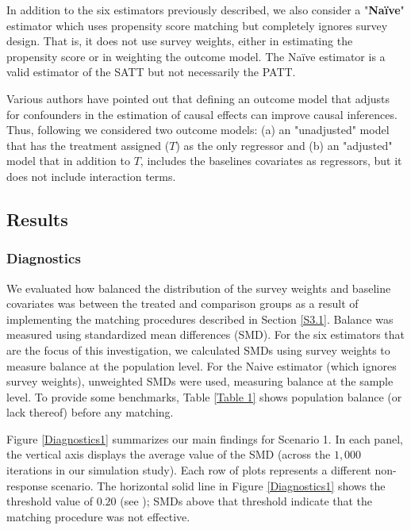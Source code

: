 \documentclass[oupdraft]{bio}
\begin{document}
In addition to the six estimators previously described, we also consider a "\textbf{Naïve}" estimator which uses propensity score matching but completely ignores survey design. That is, it does not use survey weights, either in estimating the propensity score or in weighting the outcome model. The Naïve estimator is a valid estimator of the SATT but not necessarily the PATT. 

Various authors \citep{cochran1973controlling,rubin1973use,carpenter1977matching,rubin1979using,rosenbaum1984reducing,rubin2000combining,glazerman2003nonexperimental,imai2004causal,abadie2006large} have pointed out that defining an outcome model that adjusts for confounders in the estimation of causal effects can improve causal inferences. Thus, following \cite{ridgeway2015propensity} we considered two outcome models: (a) an "unadjusted" model that has the treatment assigned ($T$) as the only regressor and (b) an "adjusted" model that in addition to $T$, includes the baselines covariates as regressors, but it does not include interaction terms.
\subsection{Results}
\label{S3.2}
\subsubsection*{Diagnostics}
We evaluated how balanced the distribution of the survey weights and baseline covariates was between the treated and comparison groups as a result of implementing the matching procedures described in Section \ref{S3.1}. Balance was measured using standardized mean differences (SMD). For the six estimators that are the focus of this investigation, we calculated SMDs using survey weights to measure balance at the population level.
For the Naive estimator (which ignores survey weights), unweighted SMDs were used, measuring balance at the sample level.
To provide some benchmarks, Table \ref{Table 1} shows population balance (or lack thereof) before any matching.

Figure \ref{Diagnostics1} summarizes our main findings for Scenario 1. In each panel, the vertical axis displays the average value of the SMD (across the $1,000$ iterations in our simulation study). Each row of plots represents a different non-response scenario. The horizontal solid line in Figure \ref{Diagnostics1} shows the threshold value of $0.20$ (see \citet{rosenbaum1985constructing}); SMDs above that threshold indicate that the matching procedure was not effective.
\end{document}
